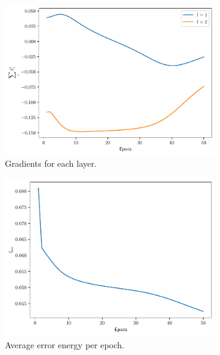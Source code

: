 \documentclass[conference]{IEEEtran}
\theoremstyle{definition}
\theoremstyle{remark}
\theoremstyle{remark}
\begin{document}
\begin{figure}
  \centering
  \begin{subfigure}[b]{0.32\textwidth}
    \centering \includegraphics[width=\textwidth]{figs/2-0.9-gradients.pdf}
    \caption{Gradients for each layer.}
  \end{subfigure}
  \begin{subfigure}[b]{0.32\textwidth}
    \centering \includegraphics[width=\textwidth]{figs/2-0.9-error.pdf}
    \caption{Average error energy per epoch.}
  \end{subfigure}
  \begin{subfigure}[b]{0.32\textwidth}

\end{subfigure}
\end{figure}
\end{document}
